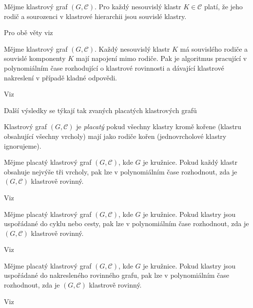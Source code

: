 \begin{theorem}
Mějme klastrový graf $(G, \mathcal C)$. Pro každý nesouvislý klastr $K \in \mathcal C$ platí, že jeho rodič a sourozenci v klastrové hierarchii jsou souvislé klastry.
\end{theorem}

Pro obě věty viz \cite{GutwengerEtAl02}

\begin{theorem}
Mějme klastrový graf $(G, \mathcal C)$. Každý nesouvislý klastr $K$ má souvislého rodiče a souvislé komponenty $K$ mají napojení mimo rodiče. Pak je algoritmus pracující v polynomiálním čase rozhodující o klastrové rovinnosti a dávající klastrové nakreslení v případě kladné odpovědi.
\end{theorem}

Viz \cite{GoodrichEtAl05}

Další výsledky se týkají tak zvaných placatých klastrových grafů

\begin{defn}
Klastrový graf $(G, \mathcal C)$ je \textit{placatý} pokud všechny klastry kromě kořene (klastru obsahující všechny vrcholy) mají jako rodiče kořen (jednovrcholové klastry ignorujeme).
\end{defn}

\begin{theorem}
Mějme placatý klastrový graf  $(G, \mathcal C)$, kde $G$ je kružnice. Pokud každý klastr obsahuje nejvýše tři vrcholy, pak lze v polynomiálním čase rozhodnout, zda je  $(G, \mathcal C)$ klastrově rovinný.
\end{theorem}

Viz \cite{JelinkovaEtAl07}

\begin{theorem}
Mějme placatý klastrový graf  $(G, \mathcal C)$, kde $G$ je kružnice. Pokud klastry jsou uspořádané do cyklu nebo cesty, pak lze v polynomiálním čase rozhodnout, zda je  $(G, \mathcal C)$ klastrově rovinný.
\end{theorem}

Viz \cite{CorteseEtAl04}

\begin{theorem}
Mějme placatý klastrový graf  $(G, \mathcal C)$, kde $G$ je kružnice. Pokud klastry jsou uspořádané do nakresleného rovinného grafu, pak lze v polynomiálním čase rozhodnout, zda je  $(G, \mathcal C)$ klastrově rovinný.
\end{theorem}

Viz \cite{CorteseEtAl09}

